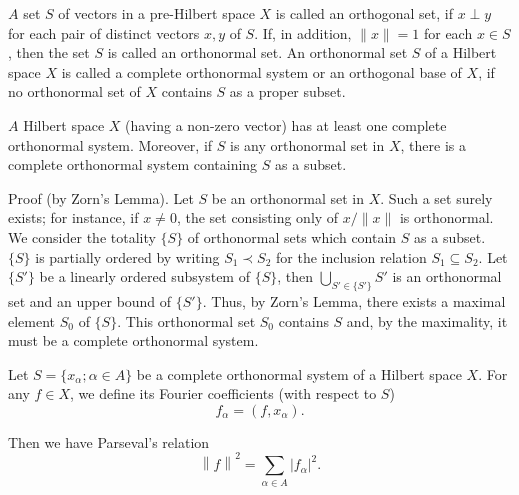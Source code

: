 \label{sec:III.4}

\begin{definition}\label{def:III.4.Definition.1} $A$ set $S$ of vectors in a pre-Hilbert space $X$ is called an orthogonal set, if $x \perp y$ for each pair of distinct vectors $x, y$ of $S$. If, in addition, $\|x\| = 1$ for each $x \in S$, then the set $S$ is called an orthonormal set. An orthonormal set $S$ of a Hilbert space $X$ is called a complete orthonormal system or an orthogonal base of $X$, if no orthonormal set of $X$ contains $S$ as a proper subset. 
\end{definition}

\begin{theorem}\label{thm:III.4.Theorem.1} $A$ Hilbert space $X$ (having a non-zero vector) has at least one complete orthonormal system. Moreover, if $S$ is any orthonormal set in $X$, there is a complete orthonormal system containing $S$ as a subset. 
\end{theorem}

Proof (by Zorn's Lemma). Let $S$ be an orthonormal set in $X$. Such a set surely exists; for instance, if $x \neq 0$, the set consisting only of $x / \|x\|$ is orthonormal. We consider the totality $\{S\}$ of orthonormal sets which contain $S$ as a subset. $\{S\}$ is partially ordered by writing $S_1 \prec S_2$ for the inclusion relation $S_1 \subseteq S_2$. Let $\{S'\}$ be a linearly ordered subsystem of $\{S\}$, then $\bigcup\limits_{S' \in \{S'\}} S'$ is an orthonormal set and an upper bound of $\{S'\}$. Thus, by Zorn's Lemma, there exists a maximal element $S_0$ of $\{S\}$. This orthonormal set $S_0$ contains $S$ and, by the maximality, it must be a complete orthonormal system. 

\begin{theorem}\label{thm:III.4.Theorem.2} Let $S = \{x_{\alpha}; \alpha \in A\}$ be a complete orthonormal system of a Hilbert space $X$. For any $f \in X$, we define its Fourier coefficients (with respect to $S$) 
\begin{equation}\label{eq:III.4.1}
f _{\alpha} = (f, x _{\alpha}).
\end{equation}
\end{theorem}

Then we have Parseval's relation 
\begin{equation}\label{eq:III.4.2}
\left\| f \right\| ^{2} = \sum\limits_{\alpha \in A} \left| f _{\alpha} \right| ^{2}.
\end{equation}


